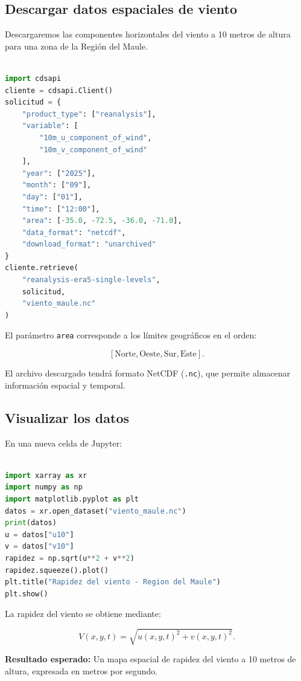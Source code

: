 \documentclass[11pt,a4paper]{article}
\begin{document}
\subsection{Descargar datos espaciales de viento}

Descargaremos las componentes horizontales del viento
a 10 metros de altura para una zona de la Región del Maule.

\begin{lstlisting}[style=codigo,language=Python]

import cdsapi
cliente = cdsapi.Client()
solicitud = {
    "product_type": ["reanalysis"],
    "variable": [
        "10m_u_component_of_wind",
        "10m_v_component_of_wind"
    ],
    "year": ["2025"],
    "month": ["09"],
    "day": ["01"],
    "time": ["12:00"],
    "area": [-35.0, -72.5, -36.0, -71.0],
    "data_format": "netcdf",
    "download_format": "unarchived"
}
cliente.retrieve(
    "reanalysis-era5-single-levels",
    solicitud,
    "viento_maule.nc"
)
\end{lstlisting}

El parámetro \texttt{area} corresponde a los límites
geográficos en el orden:

\[
[\text{Norte},\text{Oeste},\text{Sur},\text{Este}].
\]

El archivo descargado tendrá formato NetCDF (\texttt{.nc}),
que permite almacenar información espacial y temporal.

\subsection{Visualizar los datos}

En una nueva celda de Jupyter:

\begin{lstlisting}[style=codigo,language=Python]

import xarray as xr
import numpy as np
import matplotlib.pyplot as plt
datos = xr.open_dataset("viento_maule.nc")
print(datos)
u = datos["u10"]
v = datos["v10"]
rapidez = np.sqrt(u**2 + v**2)
rapidez.squeeze().plot()
plt.title("Rapidez del viento - Region del Maule")
plt.show()
\end{lstlisting}

La rapidez del viento se obtiene mediante:

\[
V(x,y,t)=\sqrt{u(x,y,t)^2+v(x,y,t)^2}.
\]

\noindent
\textbf{Resultado esperado:}
Un mapa espacial de rapidez del viento a 10 metros
de altura, expresada en metros por segundo.
\end{document}
